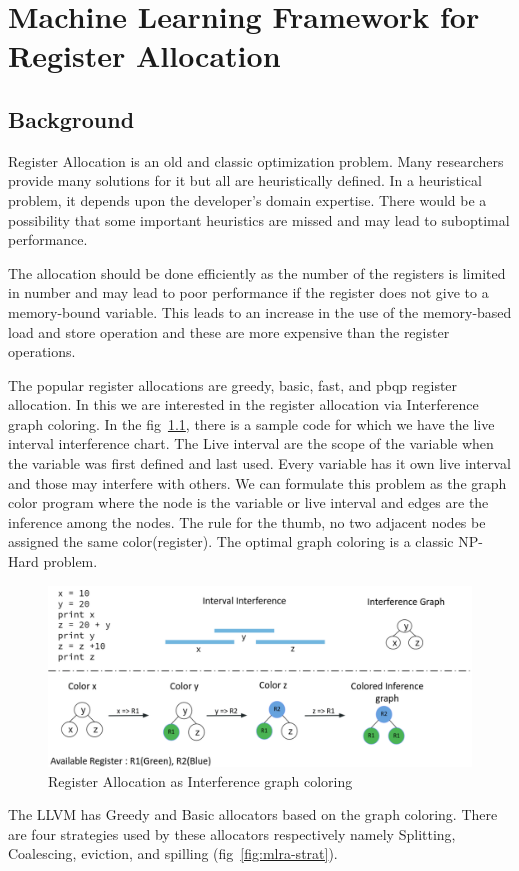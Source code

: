 \chapter{Machine Learning Framework for Register Allocation}
\label{chap:ch5}

\section{Background}
Register Allocation is an old and classic optimization problem. Many researchers provide many solutions for it but all are heuristically defined. In a heuristical problem, it depends upon the developer’s domain expertise. There would be a possibility that some important heuristics are missed and may lead to suboptimal performance.

The allocation should be done efficiently as the number of the registers is limited in number and may lead to poor performance if the register does not give to a memory-bound variable. This leads to an increase in the use of the memory-based load and store operation and these are more expensive than the register operations. 

The popular register allocations are greedy, basic, fast, and pbqp register allocation. In this we are interested in the register allocation via Interference graph coloring. In the fig~\ref{fig:mlra-coloring}, there is a sample code for which we have the live interval interference chart. The Live interval are the scope of the variable when the variable was first defined and last used. Every variable has it own live interval and those may interfere with others. We can formulate this problem as the graph color program where the node is the variable or live interval and edges are the inference among the nodes. The rule for the thumb, no two adjacent nodes be assigned the same color(register). The optimal graph coloring is a classic NP-Hard problem. 

\begin{figure}[t]
    \centering
    \includegraphics[scale=0.4]{figures/chapter-5/mlra_coloring.png}
    \caption{Register Allocation as Interference graph coloring}
     \label{fig:mlra-coloring}
\end{figure}
The LLVM has Greedy and Basic allocators based on the graph coloring. There are four strategies used by these allocators respectively namely Splitting, Coalescing, eviction, and spilling (fig~\ref{fig:mlra-strat}). 

